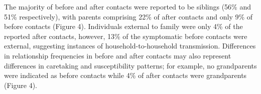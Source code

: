 The majority of before and after contacts were reported to be siblings (56\% and 51\% respectively), with parents comprising 22\% of after contacts and only 9\% of before
contacts (Figure 4). Individuals external to family were only 4\% of the reported after contacts, however, 13\% of the symptomatic before contacts were external, suggesting instances of household-to-household transmission. Differences in relationship frequencies in before and after contacts may also represent differences in caretaking and susceptibility patterns; for example, no grandparents were indicated as before contacts while 4\% of after contacts were grandparents (Figure 4).
